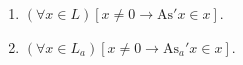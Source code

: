 \begin{enumerate}
\item $(\forall x \in L)[x \neq 0 \rightarrow \mathrm{As}' x \in x].$
\item $(\forall x \in L_a)[x \neq 0 \rightarrow \mathrm{As}_a' x \in x].$
\end{enumerate}
